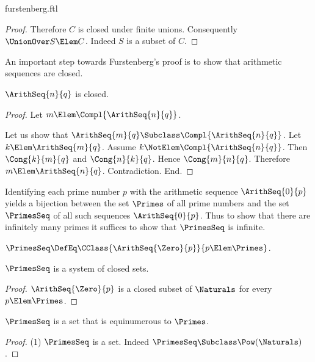 \documentclass{stex}
\begin{document}
\begin{smodule}{furstenberg.ftl}
\begin{forthel}
\begin{proof}
    Therefore $C$ is closed under finite unions.
    Consequently $\UnionOver S \Elem C$.
    Indeed $S$ is a subset of $C$.
  \end{proof}
\end{forthel}

An important step towards Furstenberg's proof is to show that arithmetic
sequences are closed.

\begin{forthel}
  \begin{lemma}
    $\ArithSeq{n}{q}$ is closed.
  \end{lemma}
  \begin{proof}
    Let $m \Elem \Compl{\ArithSeq{n}{q}}$.

    Let us show that $\ArithSeq{m}{q} \Subclass \Compl{\ArithSeq{n}{q}}$.
      Let $k \Elem \ArithSeq{m}{q}$.
      Assume $k \NotElem \Compl{\ArithSeq{n}{q}}$.
      Then $\Cong{k}{m}{q}$ and $\Cong{n}{k}{q}$.
      Hence $\Cong{m}{n}{q}$.
      Therefore $m \Elem \ArithSeq{n}{q}$.
      Contradiction.
    End.
  \end{proof}
\end{forthel}

Identifying each prime number $p$ with the arithmetic sequence $\ArithSeq{0}{p}$
yields a bijection between the set $\Primes$ of all prime numbers and the set
$\PrimesSeq$ of all such sequences $\ArithSeq{0}{p}$.
Thus to show that there are infinitely many primes it suffices to show that
$\PrimesSeq$ is infinite.

\begin{forthel}
  \begin{definition}[for=PrimesSeq]
    $\PrimesSeq \DefEq \CClass{\ArithSeq{\Zero}{p}}{p \Elem \Primes}$.
  \end{definition}

  \begin{lemma}
    $\PrimesSeq$ is a system of closed sets.
  \end{lemma}
  \begin{proof}
    $\ArithSeq{\Zero}{p}$ is a closed subset of $\Naturals$ for every $p \Elem \Primes$.
  \end{proof}

  \begin{lemma}
    $\PrimesSeq$ is a set that is equinumerous to $\Primes$.
  \end{lemma}
  \begin{proof}
    (1) $\PrimesSeq$ is a set.
    Indeed $\PrimesSeq \Subclass \Pow(\Naturals)$.


\end{proof}
\end{forthel}
\end{smodule}
\end{document}
